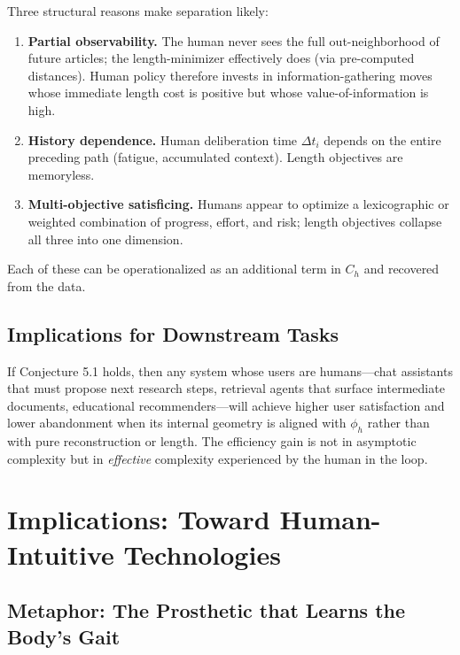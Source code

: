 \documentclass[11pt,a4paper]{report}
\begin{document}
Three structural reasons make separation likely:

\begin{enumerate}
    \item \textbf{Partial observability.} The human never sees the full out-neighborhood of future articles; the length-minimizer effectively does (via pre-computed distances). Human policy therefore invests in information-gathering moves whose immediate length cost is positive but whose value-of-information is high.
    \item \textbf{History dependence.} Human deliberation time \(\Delta t_i\) depends on the entire preceding path (fatigue, accumulated context). Length objectives are memoryless.
    \item \textbf{Multi-objective satisficing.} Humans appear to optimize a lexicographic or weighted combination of progress, effort, and risk; length objectives collapse all three into one dimension.
\end{enumerate}

Each of these can be operationalized as an additional term in \(C_h\) and recovered from the data.

\section{Implications for Downstream Tasks}

If Conjecture 5.1 holds, then any system whose users are humans—chat assistants that must propose next research steps, retrieval agents that surface intermediate documents, educational recommenders—will achieve higher user satisfaction and lower abandonment when its internal geometry is aligned with \(\phi_h\) rather than with pure reconstruction or length. The efficiency gain is not in asymptotic complexity but in \textit{effective} complexity experienced by the human in the loop.

\chapter{Implications: Toward Human-Intuitive Technologies}

\section{Metaphor: The Prosthetic that Learns the Body’s Gait}
\end{document}
